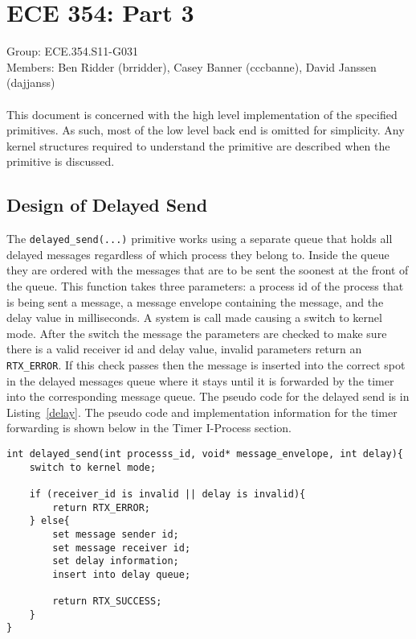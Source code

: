 \documentclass[oneside]{article}
\begin{document}
\lstset{language=C, 
        frame=single, 
        breaklines=true,
        basicstyle=\small\ttfamily,
        columns=fullflexible}
\section*{ECE 354: Part 3}
Group: ECE.354.S11-G031 \\
Members: Ben Ridder (brridder), Casey Banner (cccbanne), 
David Janssen (dajjanss) \\ \\
This document is concerned with the high level implementation of the 
specified primitives. As such, most of the low level back end is omitted for
simplicity. Any kernel structures required to understand the primitive are
described when the primitive is discussed.

\subsection*{Design of Delayed Send} 
The \texttt{delayed\_send(...)} primitive works using a separate queue that holds
all delayed messages regardless of which process they belong to. Inside the 
queue they are ordered with the messages that are to be sent the soonest at the
front of the queue. This function takes three parameters: a process id of the 
process that is being sent a message, a message envelope containing the message, and
the delay value in milliseconds. A system is call made causing a switch to kernel mode. 
After the switch the message the parameters are checked to make sure there is a valid 
receiver id and delay value, invalid parameters return an \texttt{RTX\_ERROR}. If this 
check passes then the message is inserted into the correct spot in the delayed messages 
queue where it stays until it is forwarded by the timer into the corresponding message 
queue. The pseudo code for the delayed send is in Listing~\ref{delay}. The pseudo code 
and implementation information for the timer forwarding is shown below in the Timer 
I-Process section.

\begin{lstlisting}
int delayed_send(int processs_id, void* message_envelope, int delay){
    switch to kernel mode;

    if (receiver_id is invalid || delay is invalid){
        return RTX_ERROR;
    } else{
        set message sender id;
        set message receiver id;
        set delay information;
        insert into delay queue;

        return RTX_SUCCESS;
    }
}
\end{lstlisting}
\end{document}
